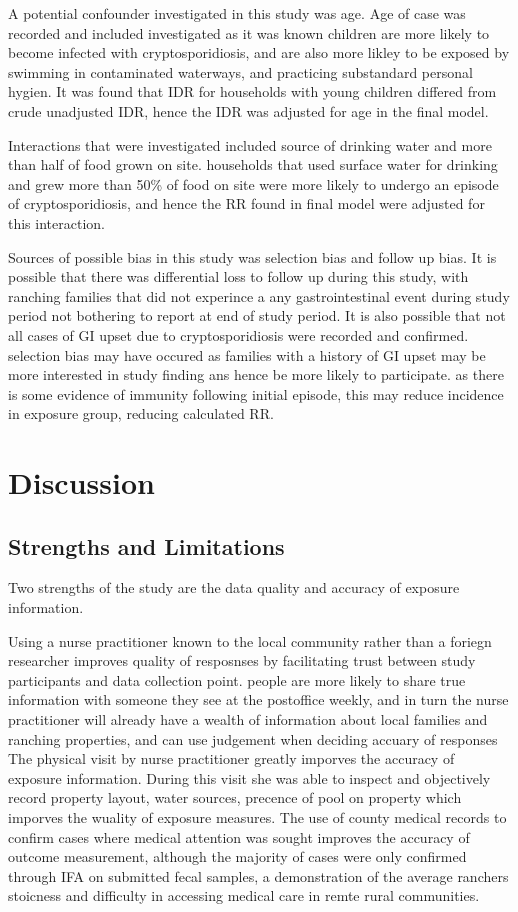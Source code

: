 \documentclass[12pt]{article}
\begin{document}
		A potential confounder investigated in this study was age.
		Age of case was recorded and included investigated as it was known children are more likely to become infected with cryptosporidiosis, and are also more likley to be exposed by swimming in contaminated waterways, and practicing substandard personal hygien.
		It was found that IDR for households with young children differed from crude unadjusted IDR, hence the IDR was adjusted for age in the final model.


		Interactions that were investigated included source of drinking water and more than half of food grown on site.
		households that used surface water for drinking and grew more than 50\% of food on site were more likely to undergo an episode of cryptosporidiosis, and hence the RR found in final model were adjusted for this interaction.


		Sources of possible bias in this study was selection bias and follow up bias.
		It is possible that there was differential loss to follow up during this study, with ranching families that did not experince a any gastrointestinal event during study period not bothering to report at end of study period.
		It is also possible that not all cases of GI upset due to cryptosporidiosis were recorded and confirmed. 
		selection bias may have occured as families with a history of GI upset may be more interested in study finding ans hence be more likely to participate. as there is some evidence of immunity following initial episode, this may reduce incidence in exposure group, reducing calculated RR.


	\section{Discussion} 


	\subsection{Strengths and Limitations}
		Two strengths of the study are the data quality and accuracy of exposure information.

		Using a nurse practitioner known to the local community rather than a foriegn researcher improves quality of resposnses by facilitating trust between study participants and data collection point. 
		people are more likely to share true information with someone they see at the postoffice weekly, and in turn the nurse practitioner will already have a wealth of information about local families and ranching properties, and can use judgement when deciding accuary of responses
		The physical visit by nurse practitioner greatly imporves the accuracy of exposure information. 
		During this visit she was able to inspect and objectively record property layout, water sources, precence of pool on property which imporves the wuality of exposure measures.
		The use of county medical records to confirm cases where medical attention was sought improves the accuracy of outcome measurement, although the majority of cases were only confirmed through IFA on submitted fecal samples, a demonstration of the average ranchers stoicness and difficulty in accessing medical care in remte rural communities. 
\end{document}
